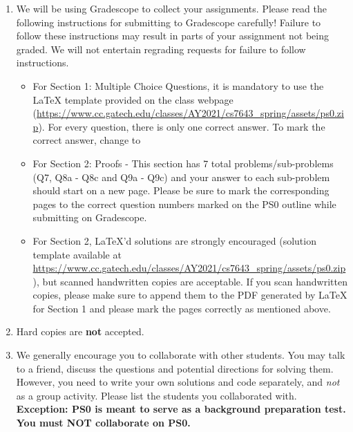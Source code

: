 \documentclass[11pt,english, answers]{exam}
\begin{document}
\begin{enumerate}
 \item We will be using Gradescope to collect your assignments.  Please read the following instructions for submitting to Gradescope carefully! Failure to follow these instructions may result in parts of your assignment not being graded. We will not entertain regrading requests for failure to follow instructions.
      \begin{itemize}
        \item
          For Section 1: Multiple Choice Questions, it is mandatory to use the {\LaTeX} template provided on the class webpage (\url{https://www.cc.gatech.edu/classes/AY2021/cs7643_spring/assets/ps0.zip}).
           For every question, there is only one correct answer. To mark the correct answer, change \codeword{\choice} to \codeword{\CorrectChoice}

           \item
                For Section 2: Proofs - This section has 7 total problems/sub-problems (Q7, Q8a - Q8c and Q9a - Q9c) and your answer to each sub-problem should start on a new page. Please be sure to mark the corresponding pages to the correct question numbers marked on the PS0 outline while submitting on Gradescope. 
           \item For Section 2, \LaTeX'd  solutions are strongly encouraged (solution template
           available at \\
           \url{https://www.cc.gatech.edu/classes/AY2021/cs7643_spring/assets/ps0.zip}),
           but scanned handwritten copies are acceptable. If you scan handwritten copies, please make sure to append them to the PDF generated by {\LaTeX} for Section 1 and please mark the pages correctly as mentioned above. 

      \end{itemize}

 \item Hard copies are \textbf{not} accepted.
\item We generally encourage you to collaborate with other students. You may talk to a friend,
discuss the questions and potential directions for solving them. However, you need to write
your own solutions and code separately, and \emph{not} as a group activity.
Please list the students you collaborated with. \\
\textbf{Exception: PS0 is meant to serve as a background preparation test. You must NOT collaborate on PS0.}

\end{enumerate}

\pagebreak


%
%
\end{document}
